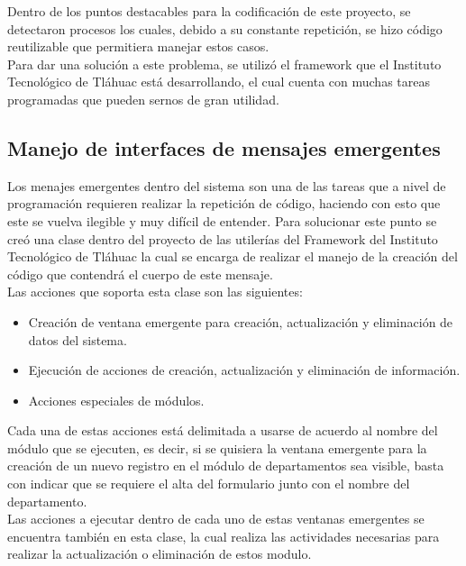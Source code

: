 		Dentro de los puntos destacables para la codificaci\'on de este proyecto, se detectaron procesos los cuales, debido a su constante repetici\'on, se hizo c\'odigo reutilizable que permitiera manejar estos casos.\\
		
		Para dar una soluci\'on a este problema, se utiliz\'o el framework que el Instituto Tecnol\'ogico de Tl\'ahuac est\'a desarrollando, el cual cuenta con muchas tareas programadas que pueden sernos de gran utilidad.\\

		\subsection{Manejo de interfaces de mensajes emergentes}

			Los menajes emergentes dentro del sistema son una de las tareas que a nivel de programaci\'on requieren realizar la repetici\'on de c\'odigo, haciendo con esto que este se vuelva ilegible y muy dif\'icil de entender. Para solucionar este punto se cre\'o una clase dentro del proyecto de las utiler\'ias del Framework del Instituto Tecnol\'ogico de Tl\'ahuac la cual se encarga de realizar el manejo de la creaci\'on del c\'odigo que contendr\'a el cuerpo de este mensaje.\\

			Las acciones que soporta esta clase son las siguientes:
			\begin{itemize}
				\item Creaci\'on de ventana emergente para creaci\'on, actualizaci\'on y eliminaci\'on de datos del sistema.
				\item Ejecuci\'on de acciones de creaci\'on, actualizaci\'on y eliminaci\'on de informaci\'on.
				\item Acciones especiales de m\'odulos.
			\end{itemize}

			Cada una de estas acciones est\'a delimitada a usarse de acuerdo al nombre del m\'odulo que se ejecuten, es decir, si se quisiera la ventana emergente para la creaci\'on de un nuevo registro en el m\'odulo de departamentos sea visible, basta con indicar que se requiere el alta del formulario junto con el nombre del departamento.\\

			Las acciones a ejecutar dentro de cada uno de estas ventanas emergentes se encuentra tambi\'en en esta clase, la cual realiza las actividades necesarias para realizar la actualizaci\'on o eliminaci\'on de estos modulo.


